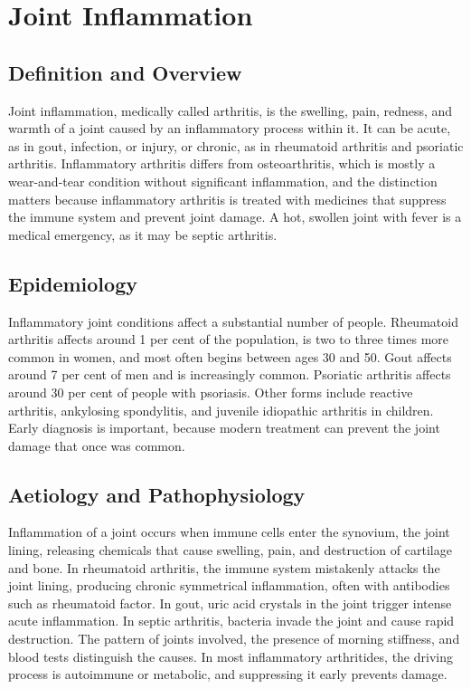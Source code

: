 \chapter{Joint Inflammation}

\section*{Definition and Overview}
Joint inflammation, medically called arthritis, is the swelling, pain, redness, and warmth of a joint caused by an inflammatory process within it. It can be acute, as in gout, infection, or injury, or chronic, as in rheumatoid arthritis and psoriatic arthritis. Inflammatory arthritis differs from osteoarthritis, which is mostly a wear-and-tear condition without significant inflammation, and the distinction matters because inflammatory arthritis is treated with medicines that suppress the immune system and prevent joint damage. A hot, swollen joint with fever is a medical emergency, as it may be septic arthritis.

\section*{Epidemiology}
Inflammatory joint conditions affect a substantial number of people. Rheumatoid arthritis affects around 1 per cent of the population, is two to three times more common in women, and most often begins between ages 30 and 50. Gout affects around 7 per cent of men and is increasingly common. Psoriatic arthritis affects around 30 per cent of people with psoriasis. Other forms include reactive arthritis, ankylosing spondylitis, and juvenile idiopathic arthritis in children. Early diagnosis is important, because modern treatment can prevent the joint damage that once was common.

\section*{Aetiology and Pathophysiology}
Inflammation of a joint occurs when immune cells enter the synovium, the joint lining, releasing chemicals that cause swelling, pain, and destruction of cartilage and bone. In rheumatoid arthritis, the immune system mistakenly attacks the joint lining, producing chronic symmetrical inflammation, often with antibodies such as rheumatoid factor. In gout, uric acid crystals in the joint trigger intense acute inflammation. In septic arthritis, bacteria invade the joint and cause rapid destruction. The pattern of joints involved, the presence of morning stiffness, and blood tests distinguish the causes. In most inflammatory arthritides, the driving process is autoimmune or metabolic, and suppressing it early prevents damage.

